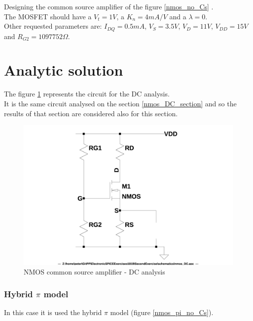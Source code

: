 \documentclass[10pt,a4paper]{book}
\begin{document}
Designing the common source amplifier of the figure \ref{nmos_no_Cs} .\\
The MOSFET should have a $V_t = 1V$, a $K_n = 4mA/V$ and a $\lambda = 0$.\\
Other requested parameters are: $I_{DQ} = 0.5mA$, $V_S = 3.5V$, $V_D = 11V$, $V_{DD} = 15V$ and $R_{G2} = 1097752\Omega$.\par

\section{Analytic solution}
The figure \ref{nmos_DC_no_Cs} represents the circuit for the DC analysis.\\
It is the same circuit analysed on the section \ref{nmos_DC_section} and so the results of that section are considered also for this section.\par

\begin{figure}[h]
  \centering
  \includegraphics[width=12cm]{schematics/nmos_DC.jpg}
  \caption{NMOS common source amplifier - DC analysis}
  \label{nmos_DC_no_Cs}
\end{figure}

\subsubsection{Hybrid $\pi$ model}
In this case it is used the hybrid $\pi$ model (figure \ref{nmos_pi_no_Cs}).\par
\end{document}
